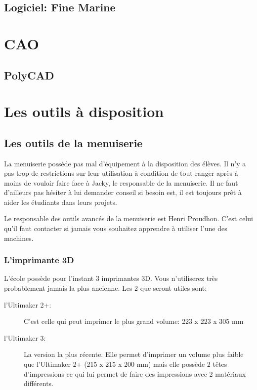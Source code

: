 \documentclass[a4paper, 11pt]{report}
\begin{document}
\chapter{Logiciel: Fine Marine}

\part{CAO}

\chapter{PolyCAD}

\part{Les outils à disposition}

\chapter{Les outils de la menuiserie}
La menuiserie possède pas mal d'équipement à la disposition des élèves. Il n'y a pas trop de restrictions sur leur utilisation à condition de tout ranger après à moins de vouloir faire face à Jacky, le responsable de la menuiserie. Il ne faut d'ailleurs pas hésiter à lui demander conseil si besoin est, il est toujours prêt à aider les étudiants dans leurs projets.

Le responsable des outils avancés de la menuiserie est Henri Proudhon. C'est celui qu'il faut contacter si jamais vous souhaitez apprendre à utiliser l'une des machines.

\section{L'imprimante 3D}
L'école possède pour l'instant 3 imprimantes 3D. Vous n'utiliserez très probablement jamais la plus ancienne. Les 2 que seront utiles sont:
\begin{description}
\item[l'Ultimaker 2+:]C'est celle qui peut imprimer le plus grand volume: 223 x 223 x 305 mm
\item[l'Ultimaker 3:]La version la plus récente. Elle permet d'imprimer un volume plus faible que l'Ultimaker 2+ (215 x 215 x 200 mm) mais elle possède 2 têtes d'impressions ce qui lui permet de faire des impressions avec 2 matériaux différents.
\end{description}
\end{document}
